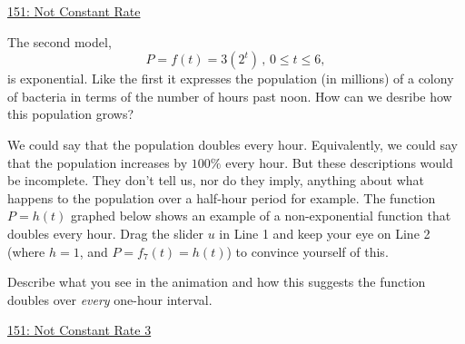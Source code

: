 \documentclass{ximera}
\begin{document}
\href{https://www.desmos.com/calculator/ehtzdzckmy}{151: Not Constant Rate}

 
\begin{onlineOnly}
    \begin{center}
\end{center}
\end{onlineOnly}




The second model,
\[
   P =f(t) =3 (2^t) \, , \, 0\leq t \leq 6 ,
\]
is exponential. Like the first it expresses the population (in millions) of a colony of bacteria in terms of the number of hours past noon. How can we desribe how this population grows?

We could say that the population doubles every hour. Equivalently, we could say that the population increases by $100\%$ every hour. But these descriptions would be incomplete. They don't tell us, nor do they imply, anything about what happens to the population over a half-hour period for example. The function $P=h(t)$ graphed below shows an example of a non-exponential function that doubles every hour. Drag the slider $u$ in Line 1 and keep your eye on Line 2 (where $h=1$, and $P=f_7(t) = h(t)$) to convince yourself of this.

\begin{question} \label{WEWMRNERer}
Describe what you see in the animation and how this suggests the function doubles over \emph{every} one-hour interval.
\end{question}

\href{https://www.desmos.com/calculator/zapwlt6qju}{151: Not Constant Rate 3} 

 
\begin{onlineOnly}
    \begin{center}
\end{center}
\end{onlineOnly}
\end{document}
